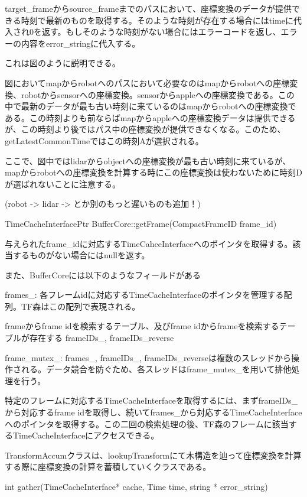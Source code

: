 \documentclass{article}
\begin{document}
\begin{multicols}{2}
target\_frameからsource\_frameまでのパスにおいて、座標変換のデータが提供できる時刻で最新のものを取得する。そのような時刻が存在する場合にはtimeに代入され0を返す。もしそのような時刻がない場合にはエラーコードを返し、エラーの内容をerror\_stringに代入する。

これは図のように説明できる。

図においてmapからrobotへのパスにおいて必要なのはmapからrobotへの座標変換、robotからsensorへの座標変換。sensorからappleへの座標変換である。この中で最新のデータが最も古い時刻に来ているのはmapからrobotへの座標変換である。この時刻よりも前ならばmapからappleへの座標変換データは提供できるが、この時刻より後ではパス中の座標変換が提供できなくなる。このため、getLatestCommonTimeではこの時刻Aが選択される。

ここで、図中ではlidarからobjectへの座標変換が最も古い時刻に来ているが、mapからrobotへの座標変換を計算する時にこの座標変換は使わないために時刻Dが選ばれないことに注意する。

(robot -> lidar -> とか別のもっと遅いものも追加！)

TimeCacheInterfacePtr BufferCore::getFrame(CompactFrameID frame\_id)

与えられたframe\_idに対応するTimeCahceInterfaceへのポインタを取得する。該当するものがない場合にはnullを返す。

また、BufferCoreには以下のようなフィールドがある



frames\_: 各フレームidに対応するTimeCacheInterfaceのポインタを管理する配列。TF森はこの配列で表現される。




frameからframe idを検索するテーブル、及びframe idからframeを検索するテーブルが存在する frameIDs\_, frameIDs\_reverse

frame\_mutex\_: frames\_, frameIDs\_, frameIDs\_reverseは複数のスレッドから操作される。データ競合を防ぐため、各スレッドはframe\_mutex\_を用いて排他処理を行う。


特定のフレームに対応するTimeCacheInterfaceを取得するには、まずframeIDs\_から対応するframe idを取得し、続いてframes\_から対応するTimeCacheInterfaceへのポインタを取得する。この二回の検索処理の後、TF森のフレームに該当するTimeCacheInterfaceにアクセスできる。

TransformAccumクラスは、lookupTransformにて木構造を辿って座標変換を計算する際に座標変換の計算を蓄積していくクラスである。

int gather(TimeCacheInterface* cache, Time time, string * error\_string)


\end{multicols}
\end{document}
